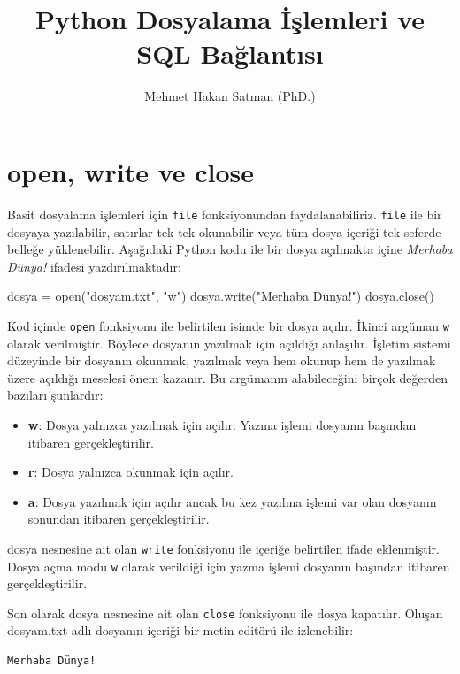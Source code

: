 \documentclass[12pt]{report}
\author{Mehmet Hakan Satman (PhD.)}
\title{Python Dosyalama İşlemleri ve SQL Bağlantısı}
\begin{document}
	\maketitle
	\tableofcontents
	
\pagebreak

\section{open, write ve close}
Basit dosyalama işlemleri için \texttt{file} fonksiyonundan faydalanabiliriz. \texttt{file} ile bir dosyaya yazılabilir, satırlar tek tek okunabilir veya tüm dosya içeriği tek seferde belleğe yüklenebilir. Aşağıdaki Python kodu ile bir dosya açılmakta içine \textit{Merhaba Dünya!} ifadesi yazdırılmaktadır:


\begin{python}
dosya = open("dosyam.txt", "w")
dosya.write("Merhaba Dunya!")
dosya.close()
\end{python}

Kod içinde \texttt{open} fonksiyonu ile belirtilen isimde bir dosya açılır. İkinci argüman \texttt{w} olarak verilmiştir. Böylece dosyanın yazılmak için açıldığı anlaşılır. İşletim sistemi düzeyinde bir dosyanın okunmak, yazılmak veya hem okunup hem de yazılmak üzere açıldığı meselesi önem kazanır. Bu argümanın alabileceğini birçok değerden bazıları şunlardır:

\begin{itemize}
	\item \textbf{w}: Dosya yalnızca yazılmak için açılır. Yazma işlemi dosyanın başından itibaren gerçekleştirilir. 
	\item \textbf{r}: Dosya yalnızca okunmak için açılır.
	\item \textbf{a}: Dosya yazılmak için açılır ancak bu kez yazılma işlemi var olan dosyanın sonundan itibaren gerçekleştirilir. 
\end{itemize}

dosya nesnesine ait olan \texttt{write} fonksiyonu ile içeriğe belirtilen ifade eklenmiştir. Dosya açma modu \texttt{w} olarak verildiği için yazma işlemi dosyanın başından itibaren gerçekleştirilir.

Son olarak dosya nesnesine ait olan \texttt{close} fonksiyonu ile dosya kapatılır. Oluşan dosyam.txt adlı dosyanın içeriği bir metin editörü ile izlenebilir:

\begin{verbatim}
Merhaba Dünya!
\end{verbatim}
\end{document}
